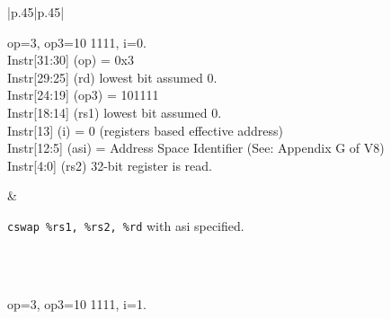 \begin{table}[p]
  \centering
  \begin{tabular}[p]{|p{.45\textwidth}|p{.45\textwidth}|}
    \hline
{} \\ 
 \hline 
 \parbox{\linewidth}{op=3, op3=10 1111, i=0.\\

    Instr[31:30] (op) = 0x3\\
    Instr[29:25] (rd)    lowest bit assumed 0.\\
    Instr[24:19] (op3) = 101111\\
    Instr[18:14] (rs1)   lowest bit assumed 0.\\
    Instr[13]    (i)  = 0 (registers based effective address)\\
    Instr[12:5]  (asi) = Address Space Identifier (See: Appendix G of V8)\\
    Instr[4:0]   (rs2)   32-bit register is read.\\
} & 
 \parbox{\linewidth}{\texttt{cswap \%rs1, \%rs2, \%rd} with asi specified.}\\
\hline
    \hline
{} \\ 
 \hline 
 \parbox{\linewidth}{op=3, op3=10 1111, i=1.\\

}
\end{tabular}
\end{table}
